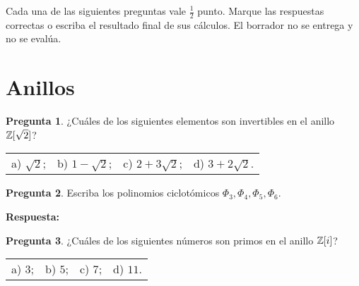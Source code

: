 \documentclass{article}
\theoremstyle{definition}
\newtheorem{pregunta}{Pregunta}
\newif\ifsolutions
\begin{document}

\newif\ifsolutions
\solutionsfalse

Cada una de las siguientes preguntas vale $\frac{1}{2}$ punto. Marque las
respuestas correctas o escriba el resultado final de sus cálculos. El borrador
no se entrega y no se evalúa.


\section*{Anillos}


\begin{pregunta}
  ¿Cuáles de los siguientes elementos son invertibles en el anillo
  $\mathbb{Z} [\sqrt{2}]$?

  \begin{center}
    \begin{tabular}{x{3cm}x{3cm}x{3cm}x{3cm}}
      a) $\sqrt{2}$; & b) $1 - \sqrt{2}$; & c) $2 + 3\sqrt{2}$; & d) $3 + 2\sqrt{2}$.
    \end{tabular}
  \end{center}
\end{pregunta}

\vspace{3em}


\begin{pregunta}
  Escriba los polinomios ciclotómicos $\Phi_3, \Phi_4, \Phi_5, \Phi_6$.
\end{pregunta}

\begin{framed}
  \noindent\textbf{Respuesta:}

  \vspace{5cm}
\end{framed}

\vspace{3em}


\begin{pregunta}
  ¿Cuáles de los siguientes números son primos en el anillo $\mathbb{Z}[i]$?

  \begin{center}
    \begin{tabular}{x{3cm}x{3cm}x{3cm}x{3cm}}
      a) $3$; & b) $5$; & c) $7$; & d) $11$.
    \end{tabular}
  \end{center}
\end{pregunta}
\end{document}
